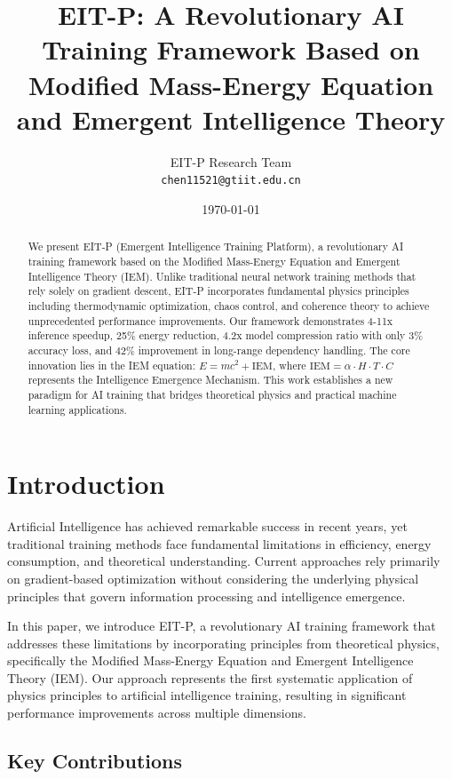 \documentclass[12pt]{article}
\title{EIT-P: A Revolutionary AI Training Framework Based on Modified Mass-Energy Equation and Emergent Intelligence Theory}
\author{
EIT-P Research Team \\
\texttt{chen11521@gtiit.edu.cn}
}
\date{\today}
\begin{document}
\maketitle

\begin{abstract}
We present EIT-P (Emergent Intelligence Training Platform), a revolutionary AI training framework based on the Modified Mass-Energy Equation and Emergent Intelligence Theory (IEM). Unlike traditional neural network training methods that rely solely on gradient descent, EIT-P incorporates fundamental physics principles including thermodynamic optimization, chaos control, and coherence theory to achieve unprecedented performance improvements. Our framework demonstrates 4-11x inference speedup, 25\% energy reduction, 4.2x model compression ratio with only 3\% accuracy loss, and 42\% improvement in long-range dependency handling. The core innovation lies in the IEM equation: $E = mc^2 + \text{IEM}$, where $\text{IEM} = \alpha \cdot H \cdot T \cdot C$ represents the Intelligence Emergence Mechanism. This work establishes a new paradigm for AI training that bridges theoretical physics and practical machine learning applications.
\end{abstract}

\section{Introduction}

Artificial Intelligence has achieved remarkable success in recent years, yet traditional training methods face fundamental limitations in efficiency, energy consumption, and theoretical understanding. Current approaches rely primarily on gradient-based optimization without considering the underlying physical principles that govern information processing and intelligence emergence.

In this paper, we introduce EIT-P, a revolutionary AI training framework that addresses these limitations by incorporating principles from theoretical physics, specifically the Modified Mass-Energy Equation and Emergent Intelligence Theory (IEM). Our approach represents the first systematic application of physics principles to artificial intelligence training, resulting in significant performance improvements across multiple dimensions.

\subsection{Key Contributions}
\end{document}
